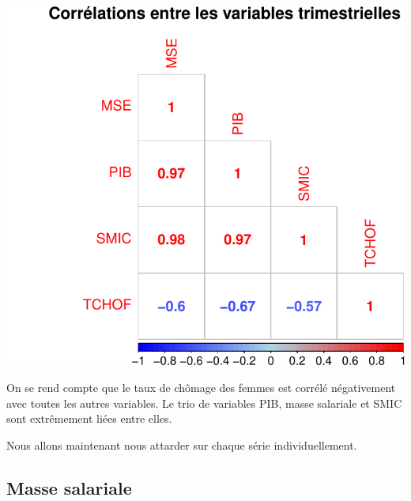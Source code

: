 \documentclass[11pt,]{article}
\newenvironment{Shaded}{\begin{snugshade}}{\end{snugshade}}
\newcommand{\KeywordTok}[1]{\textcolor[rgb]{0.13,0.29,0.53}{\textbf{{#1}}}}
\newcommand{\DataTypeTok}[1]{\textcolor[rgb]{0.13,0.29,0.53}{{#1}}}
\newcommand{\DecValTok}[1]{\textcolor[rgb]{0.00,0.00,0.81}{{#1}}}
\newcommand{\StringTok}[1]{\textcolor[rgb]{0.31,0.60,0.02}{{#1}}}
\newcommand{\NormalTok}[1]{{#1}}
\begin{document}
\includegraphics{doc_files/figure-latex/unnamed-chunk-1-1.pdf}

On se rend compte que le taux de chômage des femmes est corrélé
négativement avec toutes les autres variables. Le trio de variables PIB,
masse salariale et SMIC sont extrêmement liées entre elles.

Nous allons maintenant nous attarder sur chaque série individuellement.

\subsection{Masse salariale}\label{masse-salariale}

\begin{Shaded}
\end{Shaded}
\end{document}
